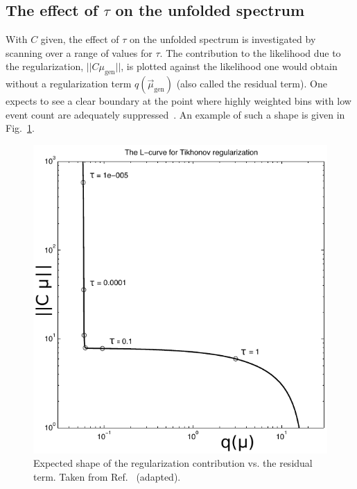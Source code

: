 \subsection{The effect of  \texorpdfstring{$\tau$}{tau} on the unfolded spectrum}

With $C$ given, the effect of $\tau$ on the unfolded spectrum is investigated by scanning over a range of values for $\tau$.
% 
The contribution to the likelihood due to the regularization, $|| C \mu_{\text{gen}} ||$, is plotted against the likelihood one would obtain without a regularization term $q(\vec{\mu}_{\text{gen}})$ (also called the residual term).
% 
One expects to see a clear boundary at the point where highly weighted bins with low event count are adequately suppressed~\cite{Hansen:LShape}.
% 
An example of such a shape is given in Fig.~\ref{fig:expectedlshape}.

\begin{figure}[ht]
 \begin{center}
   \includegraphics[width=\halflinewidth]{img/differentials/regularization/lshapetheory.pdf}
   \caption{ Expected shape of the regularization contribution vs. the residual term. Taken from Ref.~\cite{Hansen:LShape} (adapted). }
   \label{fig:expectedlshape}
 \end{center}
\end{figure}



